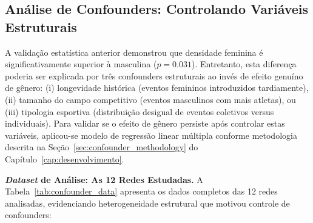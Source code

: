 \subsection{Análise de Confounders: Controlando Variáveis Estruturais}
\label{sec:resultados_confounders}

A validação estatística anterior demonstrou que densidade feminina é significativamente superior à masculina ($p = 0.031$). Entretanto, esta diferença poderia ser explicada por três confounders estruturais ao invés de efeito genuíno de gênero: (i) longevidade histórica (eventos femininos introduzidos tardiamente), (ii) tamanho do campo competitivo (eventos masculinos com mais atletas), ou (iii) tipologia esportiva (distribuição desigual de eventos coletivos versus individuais). Para validar se o efeito de gênero persiste após controlar estas variáveis, aplicou-se modelo de regressão linear múltipla conforme metodologia descrita na Seção~\ref{sec:confounder_methodology} do Capítulo~\ref{cap:desenvolvimento}.

\textbf{\textit{Dataset} de Análise: As 12 Redes Estudadas.}
A Tabela~\ref{tab:confounder_data} apresenta os dados completos das 12 redes analisadas, evidenciando heterogeneidade estrutural que motivou controle de confounders:

